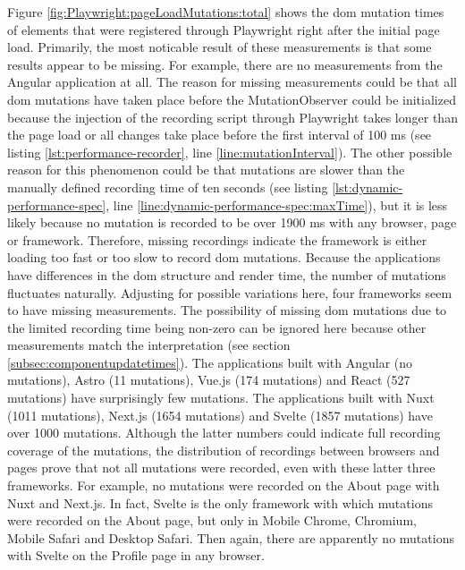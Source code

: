 \documentclass[a4paper, 12pt]{article}
\begin{document}
Figure \ref{fig:Playwright:pageLoadMutations:total} shows the \acrshort{dom} mutation times of elements that were registered through Playwright right after the initial page load.
Primarily, the most noticable result of these measurements is that some results appear to be missing.
For example, there are no measurements from the Angular application at all.
The reason for missing measurements could be that all \acrshort{dom} mutations have taken place before the MutationObserver could be initialized because the injection of the recording script through Playwright takes longer than the page load or all changes take place before the first interval of 100 ms (see listing \ref{lst:performance-recorder}, line \ref{line:mutationInterval}).
The other possible reason for this phenomenon could be that mutations are slower than the manually defined recording time of ten seconds (see listing \ref{lst:dynamic-performance-spec}, line \ref{line:dynamic-performance-spec:maxTime}), but it is less likely because no mutation is recorded to be over 1900 ms with any browser, page or framework.
Therefore, missing recordings indicate the framework is either loading too fast or too slow to record \acrshort{dom} mutations.
Because the applications have differences in the \acrshort{dom} structure and render time, the number of mutations fluctuates naturally.
Adjusting for possible variations here, four frameworks seem to have missing measurements.
The possibility of missing \acrshort{dom} mutations due to the limited recording time being non-zero can be ignored here because other measurements match the interpretation (see section \ref{subsec:componentupdatetimes}).
The applications built with Angular (no mutations), Astro (11 mutations), Vue.js (174 mutations) and React (527 mutations) have surprisingly few mutations.
The applications built with Nuxt (1011 mutations), Next.js (1654 mutations) and Svelte (1857 mutations) have over 1000 mutations.
Although the latter numbers could indicate full recording coverage of the mutations, the distribution of recordings between browsers and pages prove that not all mutations were recorded, even with these latter three frameworks.
For example, no mutations were recorded on the About page with Nuxt and Next.js.
In fact, Svelte is the only framework with which mutations were recorded on the About page, but only in Mobile Chrome, Chromium, Mobile Safari and Desktop Safari.
Then again, there are apparently no mutations with Svelte on the Profile page in any browser.
\end{document}
